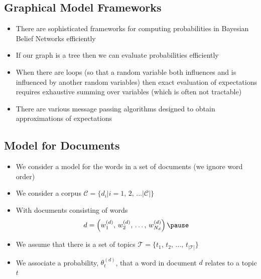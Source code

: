 
\begin{slide}
\section{Graphical Model Frameworks}

\begin{PauseHighLight}
  \begin{itemize}
  \item There are sophisticated frameworks for computing probabilities
    in Bayesian Belief Networks efficiently\pause
  \item If our graph is a tree then we can evaluate probabilities
    efficiently\pause
  \item When there are loops (so that a random variable both influences
    and is influenced by another random variables) then exact
    evaluation of expectations requires exhaustive summing over
    variables\pause{} (which is often not tractable)\pauseb
  \item There are various message passing algorithms designed to
    obtain approximations of expectations\pause
  \end{itemize}
\end{PauseHighLight}

\end{slide}



\Outline %

\begin{slide}
\section{Model for Documents}

\begin{PauseHighLight}
  \begin{itemize}
  \item We consider a model for the words in a set of documents (we
    ignore word order)\pause
  \item We consider a corpus $\mathcal{C} = \{d_i | i = 1,\, 2,\, \ldots
    |\mathcal{C}|\}$\pause
  \item With documents consisting of words
    \begin{align*}
      d = \left(w_1^{(d)},\, w_2^{(d)},\, \ldots,\, w_{N_d}^{(d)}\right)\pause
    \end{align*}
  \item We assume that there is a set of topics
    $\mathcal{T}=\{t_1,\,t_2,\,\ldots,\, t_{|\mathcal{T}|}\}$\pause
  \item We associate a probability, $\theta^{(d)}_t$, that a
    word in document $d$ relates to a topic $t$\pause
  \end{itemize}
\end{PauseHighLight}

\end{slide}

